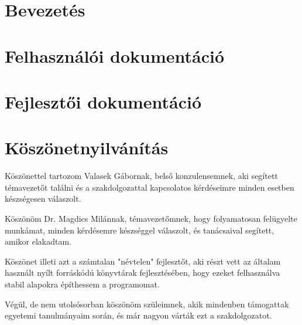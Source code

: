 \documentclass[12pt,oneside]{report}
\begin{document}


\tableofcontents

\chapter{Bevezetés}


\chapter{Felhasználói dokumentáció}


\chapter{Fejlesztői dokumentáció}


\chapter*{Köszönetnyilvánítás}

Köszönettel tartozom Valasek Gábornak, belső konzulensemnek, aki segített témavezetőt találni és a szakdolgozattal kapcsolatos kérdéseimre minden esetben készségesen válaszolt.

Köszönöm Dr. Magdics Milánnak, témavezetőmnek, hogy folyamatosan felügyelte munkámat, minden kérdésemre készséggel válaszolt, és tanácsaival segített, amikor elakadtam.

Köszönet illeti azt a számtalan "névtelen" fejlesztőt, aki részt vett az általam használt nyílt forráskódú könyvtárak fejlesztésében, hogy ezeket felhasználva stabil alapokra építhessem a programomat.

Végül, de nem utolsósorban köszönöm szüleimnek, akik mindenben támogattak egyetemi tanulmányaim során, és már nagyon várták ezt a szakdolgozatot.
\end{document}
